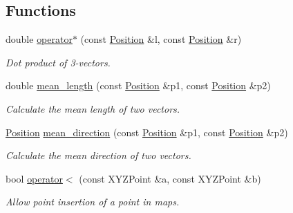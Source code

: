 \subsection*{Functions}
\begin{DoxyCompactItemize}
\item 
double \hyperlink{namespace_r_o_o_t_1_1_math_ad7a11e4384dc9dcc6a3e4e892391f26b}{operator$\ast$} (const \hyperlink{namespace_r_o_o_t_1_1_math_ac2622efe8212cb8b8a8893efd5117de8}{Position} \&l, const \hyperlink{namespace_r_o_o_t_1_1_math_ac2622efe8212cb8b8a8893efd5117de8}{Position} \&r)
\begin{DoxyCompactList}\small\item\em Dot product of 3-\/vectors. \item\end{DoxyCompactList}\item 
double \hyperlink{namespace_r_o_o_t_1_1_math_ae1d6c364099dacd36db12d2ece5adb9c}{mean\_\-length} (const \hyperlink{namespace_r_o_o_t_1_1_math_ac2622efe8212cb8b8a8893efd5117de8}{Position} \&p1, const \hyperlink{namespace_r_o_o_t_1_1_math_ac2622efe8212cb8b8a8893efd5117de8}{Position} \&p2)
\begin{DoxyCompactList}\small\item\em Calculate the mean length of two vectors. \item\end{DoxyCompactList}\item 
\hyperlink{namespace_r_o_o_t_1_1_math_ac2622efe8212cb8b8a8893efd5117de8}{Position} \hyperlink{namespace_r_o_o_t_1_1_math_a06af24d8ff174f2f4d14850e63adc68f}{mean\_\-direction} (const \hyperlink{namespace_r_o_o_t_1_1_math_ac2622efe8212cb8b8a8893efd5117de8}{Position} \&p1, const \hyperlink{namespace_r_o_o_t_1_1_math_ac2622efe8212cb8b8a8893efd5117de8}{Position} \&p2)
\begin{DoxyCompactList}\small\item\em Calculate the mean direction of two vectors. \item\end{DoxyCompactList}\item 
bool \hyperlink{namespace_r_o_o_t_1_1_math_ae526386c3fc57d159a6b9f227c859521}{operator$<$} (const XYZPoint \&a, const XYZPoint \&b)
\begin{DoxyCompactList}\small\item\em Allow point insertion of a point in maps. \item\end{DoxyCompactList}\item 

\end{DoxyCompactItemize}
